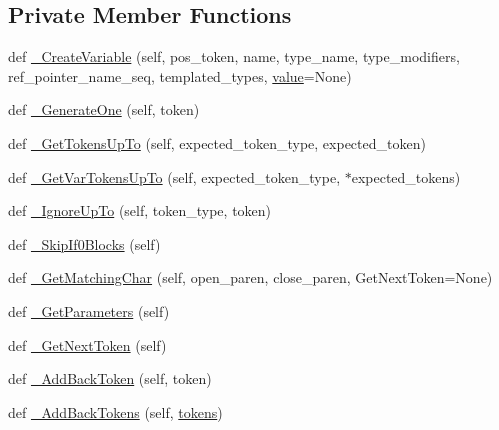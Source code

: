 \subsection*{Private Member Functions}
\begin{DoxyCompactItemize}
\item 
def \mbox{\hyperlink{classcpp_1_1ast_1_1_ast_builder_aed483f6f87068092d41c7b612553b330}{\+\_\+\+Create\+Variable}} (self, pos\+\_\+token, name, type\+\_\+name, type\+\_\+modifiers, ref\+\_\+pointer\+\_\+name\+\_\+seq, templated\+\_\+types, \mbox{\hyperlink{_obj__test_2lib_2googletest-master_2googlemock_2test_2gmock-matchers__test_8cc_a337b8a670efc0b086ad3af163f3121b6}{value}}=None)
\item 
def \mbox{\hyperlink{classcpp_1_1ast_1_1_ast_builder_ae3a006851c8f8a4b5929e5e8bcbd4618}{\+\_\+\+Generate\+One}} (self, token)
\item 
def \mbox{\hyperlink{classcpp_1_1ast_1_1_ast_builder_a93e70a799351e5c40f07efb218889b31}{\+\_\+\+Get\+Tokens\+Up\+To}} (self, expected\+\_\+token\+\_\+type, expected\+\_\+token)
\item 
def \mbox{\hyperlink{classcpp_1_1ast_1_1_ast_builder_a5de687c0b4632c8dcac42be84a8a2675}{\+\_\+\+Get\+Var\+Tokens\+Up\+To}} (self, expected\+\_\+token\+\_\+type, $\ast$expected\+\_\+tokens)
\item 
def \mbox{\hyperlink{classcpp_1_1ast_1_1_ast_builder_affc78a722f3038f6384147512fa8ef89}{\+\_\+\+Ignore\+Up\+To}} (self, token\+\_\+type, token)
\item 
def \mbox{\hyperlink{classcpp_1_1ast_1_1_ast_builder_a2e872094ebb16513f608e1be21c41dd0}{\+\_\+\+Skip\+If0\+Blocks}} (self)
\item 
def \mbox{\hyperlink{classcpp_1_1ast_1_1_ast_builder_a30936331903fe395451f8ed8ea2c26ba}{\+\_\+\+Get\+Matching\+Char}} (self, open\+\_\+paren, close\+\_\+paren, Get\+Next\+Token=None)
\item 
def \mbox{\hyperlink{classcpp_1_1ast_1_1_ast_builder_a89bbfbdcc6d029629f304aa9b643faf3}{\+\_\+\+Get\+Parameters}} (self)
\item 
def \mbox{\hyperlink{classcpp_1_1ast_1_1_ast_builder_ac22b5683a8f1a86a49751d6d0bcd4b84}{\+\_\+\+Get\+Next\+Token}} (self)
\item 
def \mbox{\hyperlink{classcpp_1_1ast_1_1_ast_builder_a264b4e18c07863c4dae117fe623a0fb2}{\+\_\+\+Add\+Back\+Token}} (self, token)
\item 
def \mbox{\hyperlink{classcpp_1_1ast_1_1_ast_builder_aa148966c6578f4560a4164db33df0fcf}{\+\_\+\+Add\+Back\+Tokens}} (self, \mbox{\hyperlink{classcpp_1_1ast_1_1_ast_builder_a1b21f8bef712e91862ccb6b1147cab0d}{tokens}})

\end{DoxyCompactItemize}
